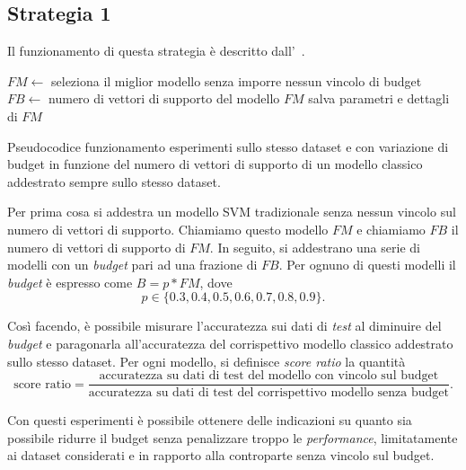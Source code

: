 \subsection{Strategia 1}
Il funzionamento di questa strategia è descritto dall'~.
\begin{algorithm}
    \SetAlgoLined
    $FM \gets$ seleziona il miglior modello senza imporre nessun vincolo di budget\;
    $FB \gets$ numero di vettori di supporto del modello $FM$\;
    salva parametri e dettagli di $FM$\;
\caption{Pseudocodice funzionamento esperimenti sullo stesso dataset e con variazione di budget in funzione del numero di vettori di supporto di un modello classico addestrato sempre sullo stesso dataset.}
\label{alg:esperimenti_1}
\end{algorithm}

Per prima cosa si addestra un modello SVM tradizionale senza nessun vincolo sul numero di vettori di supporto. Chiamiamo questo modello $FM$ e chiamiamo $FB$ il numero di vettori di supporto di $FM$.
In seguito, si addestrano una serie di modelli con un \emph{budget} pari ad una frazione di $FB$.
Per ognuno di questi modelli il \emph{budget} è espresso come $B=p*FM$, dove
\begin{equation*}
    p\in\{0.3, 0.4, 0.5, 0.6, 0.7, 0.8, 0.9\}.
\end{equation*}

Così facendo, è possibile misurare l'accuratezza sui dati di \emph{test} al diminuire del \emph{budget} e paragonarla all'accuratezza del corrispettivo modello classico addestrato sullo stesso dataset.
Per ogni modello, si definisce \emph{score ratio} la quantità
\begin{equation*}
    \text{score ratio} = \frac{\text{accuratezza su dati di test del modello con vincolo sul budget}}{\text{accuratezza su dati di test del corrispettivo modello senza budget}}.
\end{equation*}

Con questi esperimenti è possibile ottenere delle indicazioni su quanto sia possibile ridurre il budget senza penalizzare troppo le \emph{performance}, limitatamente ai dataset considerati e in rapporto alla controparte senza vincolo sul budget.

